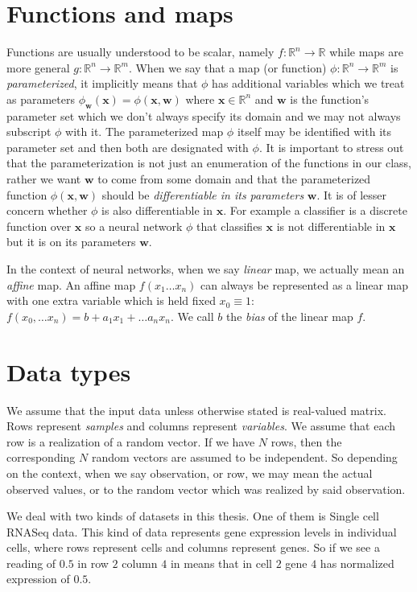 \documentclass[11pt, a4paper]{report}
\theoremstyle{plain}
\theoremstyle{definition}
\theoremstyle{remark}
\newcommand{\R}{\mathbb{R}}
\newcommand{\x}{\mathbf{x}}
\newcommand{\w}{\mathbf{w}}
\begin{document}
\section{Functions and maps}
\label{seq:functions}
Functions are usually understood to be scalar, namely $f:\R^n \to \R$ while maps
are more general $g:\R^n \to \R^m$. When we say that a map (or function) $\phi
:\R^n \to \R^m$ is \emph{parameterized}, it implicitly means that $\phi$ has
additional variables which we treat as parameters $\phi_{\w}(\x) = \phi(\x, \w)$
where $\x \in \R^n$ and $\w$ is the function's parameter set which we don't always specify
its domain and we may not always subscript $\phi$ with it. The parameterized map
$\phi$ itself may be identified with its parameter set and then both are
designated with $\phi$.
It is important to stress out that the
parameterization is not just an enumeration of the functions in our class, rather we 
want $\w$ to come from some domain and that the parameterized function
$\phi(\x,\w)$ should be \emph{differentiable in its parameters} $\w$.
It is of lesser concern whether $\phi$ is also differentiable in $\x$.
For example a classifier is a discrete function over $\x$ so a neural network
$\phi$ that classifies $\x$ is not differentiable in $\x$ but it is on its
parameters $\w$.

In the context of neural networks, when we say \emph{linear} map, we actually
mean an \emph{affine} map. An affine map $f(x_1 \dots x_n)$ can always be
represented as a linear map with one extra variable which is held fixed $x_0
\equiv 1$: $f(x_0, \dots x_n) = b + a_1 x_1 + \dots a_n x_n$. We call $b$ the
\emph{bias} of the linear map $f$.
\label{affinelinear}

\section{Data types}
We assume that the input data unless otherwise stated is real-valued matrix.
Rows represent \emph{samples} and columns represent \emph{variables}. We assume
that each row is a realization of a random vector. If we have $N$ rows, then the
corresponding $N$ random vectors are assumed to be independent. So depending on
the context, when we say observation, or row, we may mean the actual observed
values, or to the random vector which was realized by said observation.

We deal with two kinds of datasets in this thesis. One of them is Single cell
RNASeq data. This kind of data represents gene expression levels in individual
cells, where rows represent cells and columns represent genes. So if we see a
reading of $0.5$ in row $2$ column $4$ in means that in cell $2$ gene $4$ has
normalized expression of $0.5$.
\end{document}
